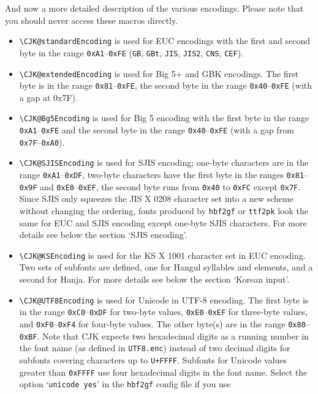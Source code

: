 \documentclass[a4paper, 11pt, draft]{article}
\begin{document}
And now a more detailed description of the various encodings. Please note
that you should never access these macros directly.
%
\begin{itemize}
\item \verb+\CJK@standardEncoding+ is used for EUC encodings with the first and second
  byte in the range \texttt{0xA1}--\texttt{0xFE} (\texttt{GB}, \texttt{GBt}, \texttt{JIS}, \texttt{JIS2}, \texttt{CNS}, \texttt{CEF}).
\item \verb+\CJK@extendedEncoding+ is used for Big 5+ and GBK encodings. The first byte
  is in the range \texttt{0x81}--\texttt{0xFE}, the second byte in the range \texttt{0x40}--\texttt{0xFE} (with a
  gap at 0x7F).
\item \verb+\CJK@Bg5Encoding+ is used for Big 5 encoding with the first byte in the
  range \texttt{0xA1}--\texttt{0xFE} and the second byte in the range \texttt{0x40}--\texttt{0xFE} (with a gap
  from \texttt{0x7F}--\texttt{0xA0}).
\item \verb+\CJK@SJISEncoding+ is used for SJIS encoding; one-byte characters are in
  the range \texttt{0xA1}--\texttt{0xDF}, two-byte characters have the first byte in the ranges
  \texttt{0x81}--\texttt{0x9F} and \texttt{0xE0}--\texttt{0xEF}, the second byte runs from \texttt{0x40} to \texttt{0xFC} except
  \texttt{0x7F}. Since SJIS only squeezes the JIS X 0208 character set into a new
  scheme without changing the ordering, fonts produced by \texttt{hbf2gf} or \texttt{ttf2pk}
  look the same for EUC and SJIS encoding except one-byte SJIS characters.
  For more details see below the section `SJIS encoding'.
\item \verb+\CJK@KSEncoding+ is used for the KS X 1001 character set in EUC encoding.
  Two sets of subfonts are defined, one for Hangul syllables and elements,
  and a second for Hanja. For more details see below the section `Korean
  input'.
\item \verb+\CJK@UTF8Encoding+ is used for Unicode in UTF-8 encoding. The first byte is
  in the range \texttt{0xC0}--\texttt{0xDF} for two-byte values, \texttt{0xE0}--\texttt{0xEF} for three-byte
  values, and \texttt{0xF0}--\texttt{0xF4} for four-byte values. The other byte(s) are in the
  range \texttt{0x80}--\texttt{0xBF}. Note that CJK expects two hexadecimal digits as a running
  number in the font name (as defined in \texttt{UTF8.enc}) instead of two decimal
  digits for subfonts covering characters up to \texttt{U+FFFF}. Subfonts for Unicode
  values greater than \texttt{0xFFFF} use four hexadecimal digits in the font name.
  Select the option `\texttt{unicode yes}' in the \texttt{hbf2gf} config file if you use

\end{itemize}
\end{document}
